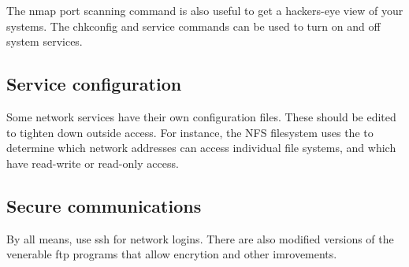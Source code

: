 The nmap port scanning command is also useful to get a hackers-eye view of
your systems.  The chkconfig and service commands can be used to turn
on and off system services.

\subsection{Service configuration}

Some network services have their own configuration files. These should be 
edited to tighten down outside access.  For instance, the NFS filesystem
uses the  to determine which network addresses can access
individual file systems, and which have read-write or read-only access.

\subsection{Secure communications}

By all means, use ssh for network logins.  There are also modified versions
of the venerable ftp programs that allow encrytion and other imrovements.
